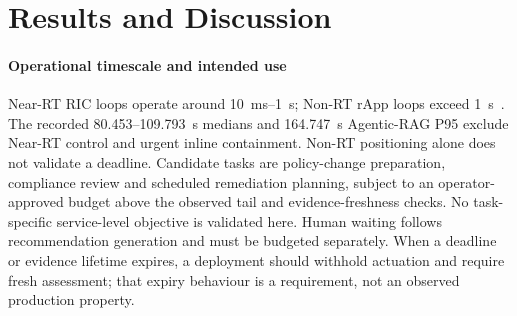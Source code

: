 \documentclass[journal]{IEEEtran}
\newif\ifshowrevisions
\newenvironment{revision}{\begingroup\ifshowrevisions\color{blue}\else\color{black}\fi}{\endgroup}
\begin{document}
\section{Results and Discussion}
\label{sec:results}

\begin{revision}
\paragraph{Operational timescale and intended use}
Near-RT RIC loops operate around 10~ms--1~s; Non-RT rApp loops exceed
1~s~\cite{oranArchitecture}.
The recorded 80.453--109.793~s medians and 164.747~s Agentic-RAG P95 exclude
Near-RT control and urgent inline containment. Non-RT positioning alone does
not validate a deadline. Candidate tasks are policy-change preparation,
compliance review and scheduled remediation planning, subject to an
operator-approved budget above the observed tail and evidence-freshness
checks. No task-specific service-level objective is validated here. Human
waiting follows recommendation generation and must be budgeted separately.
When a deadline or evidence lifetime expires, a deployment should withhold
actuation and require fresh assessment; that expiry behaviour is a requirement,
not an observed production property.
\end{revision}
\end{document}
